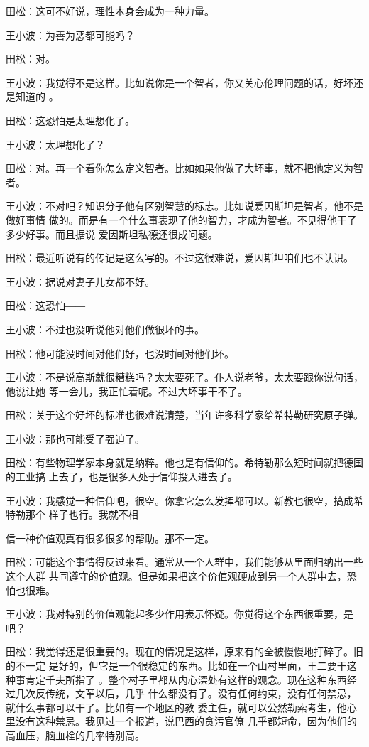 田松：这可不好说，理性本身会成为一种力量。


王小波：为善为恶都可能吗？


田松：对。


王小波：我觉得不是这样。比如说你是一个智者，你又关心伦理问题的话，好坏还是知道的
。


田松：这恐怕是太理想化了。


王小波：太理想化了？


田松：对。再一个看你怎么定义智者。比如如果他做了大坏事，就不把他定义为智者。


王小波：不对吧？知识分子他有区别智慧的标志。比如说爱因斯坦是智者，他不是做好事情
做的。而是有一个什么事表现了他的智力，才成为智者。不见得他干了多少好事。而且据说
爱因斯坦私德还很成问题。


田松：最近听说有的传记是这么写的。不过这很难说，爱因斯坦咱们也不认识。


王小波：据说对妻子儿女都不好。


田松：这恐怕――


王小波：不过也没听说他对他们做很坏的事。


田松：他可能没时间对他们好，也没时间对他们坏。


王小波：不是说高斯就很糟糕吗？太太要死了。仆人说老爷，太太要跟你说句话，他说让她
等一会儿，我正忙着呢。不过大坏事干不了。


田松：关于这个好坏的标准也很难说清楚，当年许多科学家给希特勒研究原子弹。


王小波：那也可能受了强迫了。


田松：有些物理学家本身就是纳粹。他也是有信仰的。希特勒那么短时间就把德国的工业搞
上去了，也是很多人处于信仰投入进去了。


王小波：我感觉一种信仰吧，很空。你拿它怎么发挥都可以。新教也很空，搞成希特勒那个
样子也行。我就不相


信一种价值观真有很多很多的帮助。那不一定。


田松：可能这个事情得反过来看。通常从一个人群中，我们能够从里面归纳出一些这个人群
共同遵守的价值观。但是如果把这个价值观硬放到另一个人群中去，恐怕也很难。


王小波：我对特别的价值观能起多少作用表示怀疑。你觉得这个东西很重要，是吧？


田松：我觉得还是很重要的。现在的情况是这样，原来有的全被慢慢地打碎了。旧的不一定
是好的，但它是一个很稳定的东西。比如在一个山村里面，王二要干这种事肯定千夫所指了
。整个村子里都从内心深处有这样的观念。现在这种东西经过几次反传统，文革以后，几乎
什么都没有了。没有任何约束，没有任何禁忌，就什么事都可以干了。比如有一个地区的教
委主任，就可以公然勒索考生，他心里没有这种禁忌。我见过一个报道，说巴西的贪污官僚
几乎都短命，因为他们的高血压，脑血栓的几率特别高。



